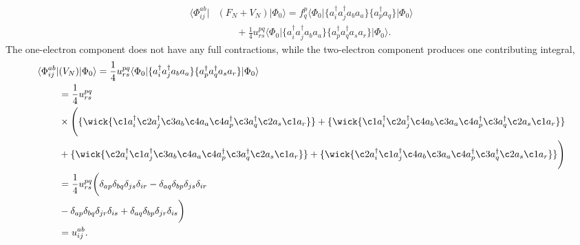 \documentclass[
    a4paper, aps, twocolumn, floatfix, superscriptaddress,
    nofootinbib]{revtex4-1}
\newcommand{\1}{\mathds{1}}
\newcommand{\bra}[1]{\langle #1\lvert}
\newcommand{\ket}[1]{\rvert #1\rangle}
\begin{document}
    \begin{equation}
        \begin{aligned}
            \bra{\Phi_{ij}^{ab}} &(F_N + V_N)\ket{\Phi_0}
             = f^p_q\bra{\Phi_0}\{a_i^\dagger a_j^\dagger a_ba_a\}
             \{a^\dagger_pa_q\}\ket{\Phi_0} \\
             &\qquad
             + \frac{1}{4}u^{pq}_{rs}
             \bra{\Phi_0}\{a_i^\dagger a_j^\dagger a_ba_a\}
             \{a^\dagger_pa^\dagger_qa_sa_r\}\ket{\Phi_0}.
        \end{aligned}
    \end{equation}
    The one-electron component does not have any full contractions, while the
    two-electron component produces one contributing integral,
    \begin{equation}
        \begin{aligned}
            \bra{\Phi_{ij}^{ab}} &(V_N)\ket{\Phi_0}
            = \frac{1}{4}u^{pq}_{rs}
            \bra{\Phi_0}\{a_i^\dagger a_j^\dagger a_ba_a\}
            \{a^\dagger_pa^\dagger_qa_sa_r\}\ket{\Phi_0} \\
                 &= \frac{1}{4} u^{pq}_{rs} \\
                 &\times
                 \Biggl(
                     \{ \wick{\c1 a^\dagger_i \c2 a^\dagger_j \c3 a_b \c4 a_a
                     \c4 a^\dagger_p \c3 a^\dagger_q \c2 a_s \c1 a_r}\}
                     +
                     \{ \wick{\c1 a^\dagger_i \c2 a^\dagger_j \c4 a_b \c3 a_a
                     \c4 a^\dagger_p \c3 a^\dagger_q \c2 a_s \c1 a_r}\}
                     \\
                     &+
                      \{ \wick{\c2 a^\dagger_i \c1 a^\dagger_j \c3 a_b \c4 a_a
                     \c4 a^\dagger_p \c3 a^\dagger_q \c2 a_s \c1 a_r}\}
                     +
                     \{ \wick{\c2 a^\dagger_i \c1 a^\dagger_j \c4 a_b \c3 a_a
                     \c4 a^\dagger_p \c3 a^\dagger_q \c2 a_s \c1 a_r}\}
                 \Biggr) \\
                 &=  \frac{1}{4} u^{pq}_{rs}
                 \biggl( \delta_{ap}\delta_{bq}\delta_{js}\delta_{ir}
                 -\delta_{aq}\delta_{bp}\delta_{js}\delta_{ir} \\
                 & -\delta_{ap}\delta_{bq}\delta_{jr}\delta_{is}
                 + \delta_{aq}\delta_{bp}\delta_{jr}\delta_{is}\biggr) \\
                &= u^{ab}_{ij}.
        \end{aligned}
        \end{equation}
\end{document}

